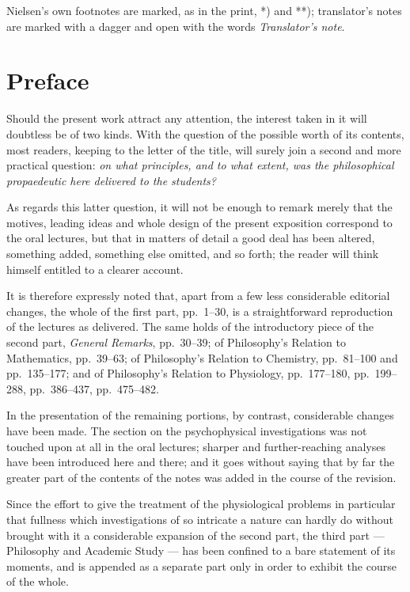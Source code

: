 \documentclass[12pt,a4paper]{book}
\begin{document}
\bigskip
\noindent
Nielsen's own footnotes are marked, as in the print, \hbox{*)} and \hbox{**)};
translator's notes are marked with a dagger and open with the words
\emph{Translator's note}.

\newpage
\chapter*{Preface}
\label{ch:forord}

Should the present work attract any attention, the interest taken in it will
doubtless be of two kinds. With the question of the possible worth of its
contents, most readers, keeping to the letter of the title, will surely join a
second and more practical question: \emph{on what principles, and to what
extent, was the philosophical propaedeutic here delivered to the students?}

As regards this latter question, it will not be enough to remark merely that
the motives, leading ideas and whole design of the present exposition
correspond to the oral lectures, but that in matters of detail a good deal has
been altered, something added, something else omitted, and so forth; the reader
will think himself entitled to a clearer account.

It is therefore expressly noted that, apart from a few less considerable
editorial changes, the whole of the first part, pp.~1--30, is a
straightforward reproduction of the lectures as delivered. The same holds of
the introductory piece of the second part, \emph{General Remarks}, pp.~30--39;
of Philosophy's Relation to Mathematics, pp.~39--63; of Philosophy's Relation
to Chemistry, pp.~81--100 and pp.~135--177;
and of Philosophy's Relation to Physiology, pp.~177--180, pp.~199--288,
pp.~386--437, pp.~475--482.

In the presentation of the remaining portions, by contrast, considerable
changes have been made. The section on the psychophysical investigations was
not touched upon at all in the oral lectures; sharper and further-reaching
analyses have been introduced here and there; and it goes without saying that
by far the greater part of the contents of the notes was added in the course of
the revision.

Since the effort to give the treatment of the physiological problems in
particular that fullness which investigations of so intricate a nature can
hardly do without brought with it a considerable expansion of the second part,
the third part --- Philosophy and Academic Study --- has been confined to a
bare statement of its moments, and is appended as a separate part only in order
to exhibit the course of the whole.
\end{document}
